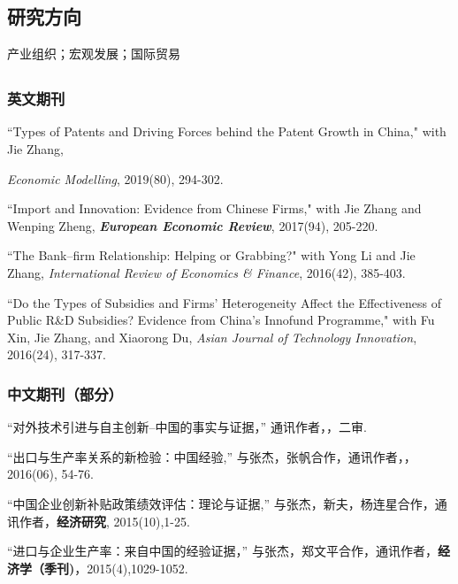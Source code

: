 \documentclass[letterpaper]{article}
\begin{document}
\subsection*{\bf{研究方向}}
产业组织；宏观发展；国际贸易



\subsection*{}

\subsubsection*{英文期刊}
``Types of Patents and Driving Forces behind the Patent Growth in China," with Jie Zhang, {\textit{Economic Modelling}, 2019(80), 294-302.

\vspace{0.5em}
``Import and Innovation: Evidence from Chinese Firms," with Jie Zhang and Wenping Zheng, {\textbf{\textit{European Economic Review}}}, 2017(94), 205-220.

\vspace{0.5em}
``The Bank–firm Relationship: Helping or Grabbing?" with Yong Li and Jie Zhang, {\textit{International Review of Economics \& Finance}}, 2016(42), 385-403.

\vspace{0.5em}
``Do the Types of Subsidies and Firms’ Heterogeneity Affect the Effectiveness of Public R\&D Subsidies? Evidence from China’s Innofund Programme," with Fu Xin, Jie Zhang, and Xiaorong Du, \textit{Asian Journal of Technology Innovation}, 2016(24), 317-337.

\subsubsection*{中文期刊（部分）}
“对外技术引进与自主创新--中国的事实与证据，” 通讯作者，{}，二审.

“出口与生产率关系的新检验：中国经验,” 与张杰，张帆合作，通讯作者，{}，2016(06), 54-76.

\vspace{0.5em}
“中国企业创新补贴政策绩效评估：理论与证据,” 与张杰，新夫，杨连星合作，通讯作者，{\bf 经济研究}, 2015(10),1-25.

\vspace{0.5em}
“进口与企业生产率：来自中国的经验证据，” 与张杰，郑文平合作，通讯作者，{\bf 经济学（季刊)}，2015(4),1029-1052.

}
\end{document}

